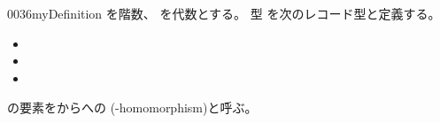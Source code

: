 \documentclass[index]{subfiles}
\begin{document}
\begin{myBlock}{0036}{myDefinition}
  を階数、
  を\myInlineMath{\myNat}代数とする。
  型
  を次のレコード型と定義する。
  \begin{itemize}
  \item {}
  \item {}
  \item {}
  \end{itemize}
  の要素をからへの
  (\myInlineMath{\myNat}-homomorphism)と呼ぶ。
\end{myBlock}
\end{document}

